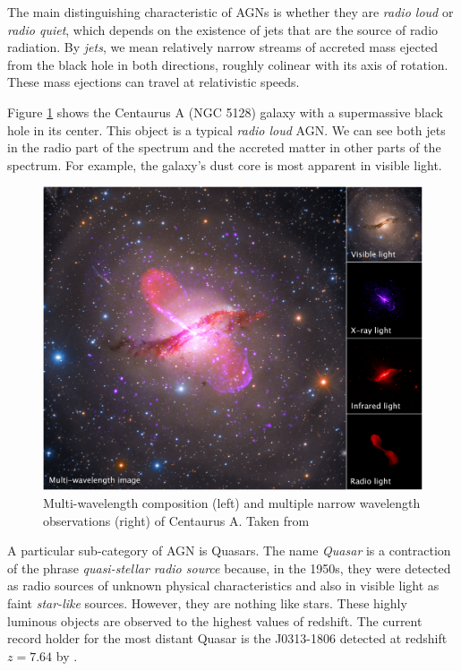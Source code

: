     The main distinguishing characteristic of AGNs is whether they are \emph{radio loud} or \emph{radio quiet}, which depends on the existence of jets that are the source of radio radiation. By \emph{jets}, we mean relatively narrow streams of accreted mass ejected from the black hole in both directions, roughly colinear with its axis of rotation. These mass ejections can travel at relativistic speeds. 
    
    Figure \ref{fig:centaurus_a_multiwave} shows the Centaurus A (NGC 5128) galaxy with a supermassive black hole in its center. This object is a typical \emph{radio loud} AGN. We can see both jets in the radio part of the spectrum and the accreted matter in other parts of the spectrum. For example, the galaxy's dust core is most apparent in visible light.

    \begin{figure}[t!]
        \centering
        \includegraphics[width=\columnwidth]{img/multiwave_centaurus_a_agn.png}
        \caption{Multi-wavelength composition (left) and multiple narrow wavelength observations (right) of Centaurus A. Taken from \cite{nasa_img_centaurus_a}}
        \label{fig:centaurus_a_multiwave}
    \end{figure}

    A particular sub-category of AGN is Quasars. The name \emph{Quasar} is a contraction of the phrase \emph{quasi-stellar radio source} because, in the 1950s, they were detected as radio sources of unknown physical characteristics and also in visible light as faint \emph{star-like} sources. However, they are nothing like stars. These highly luminous objects are observed to the highest values of redshift. The current record holder for the most distant Quasar is the J0313-1806 detected at redshift $z = 7.64$ by \cite{wang2021}. 

